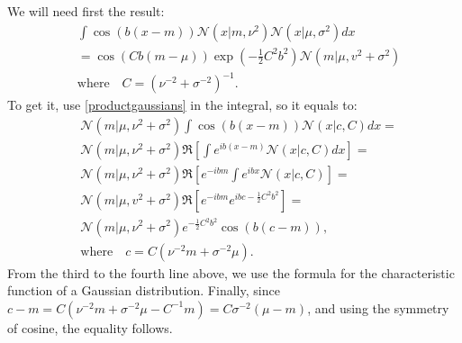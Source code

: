 We will need first the result:
\begin{equation}
\begin{split}
& \int \cos(b(x-m)) \mathcal{N}(x|m,\nu^2) \mathcal{N}(x|\mu,\sigma^2) dx \\
& = \cos(C b (m - \mu)) \exp\left(-\frac{1}{2} C^2 b^2\right) \mathcal{N}(m|\mu,v^2 + \sigma^2) \\
& \text{where} \quad C = (\nu^{-2} + \sigma^{-2})^{-1}.
\end{split}
\end{equation}
To get it, use \eqref{productgaussians} in the integral, so it equals to:
\begin{equation*}
\begin{split}
& \mathcal{N}(m|\mu,\nu^2 + \sigma^2) \int \cos(b(x-m)) \mathcal{N}(x|c,C) dx = \\
& \mathcal{N}(m|\mu,\nu^2 + \sigma^2) \Re \left[\int e^{ib(x-m)} \mathcal{N}(x|c,C) dx \right] = \\
& \mathcal{N}(m|\mu,\nu^2 + \sigma^2) \Re \left[e^{-ibm} \int e^{ibx} \mathcal{N}(x|c,C) \right] = \\
& \mathcal{N}(m|\mu,v^2 + \sigma^2) \Re \left[e^{-ibm}e^{ibc - \frac{1}{2}C^2 b^2}\right] = \\
& \mathcal{N}(m|\mu,\nu^2 + \sigma^2) e^{-\frac{1}{2}C^2 b^2} \cos(b(c-m)), \\
& \text{where} \quad c = C (\nu^{-2} m + \sigma^{-2} \mu).
\end{split}
\end{equation*}
From the third to the fourth line above, we use the formula for the characteristic function of a Gaussian distribution. Finally, since $c - m = C(\nu^{-2}m+\sigma^{-2}\mu - C^{-1} m) = C\sigma^{-2}(\mu - m)$, and using the symmetry of cosine, the equality follows.

